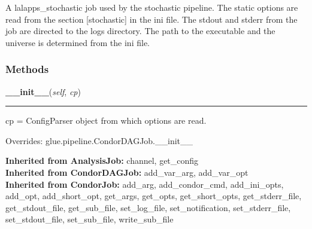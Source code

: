 A lalapps\_stochastic job used by the stochastic pipeline. The static 
options are read from the section [stochastic] in the ini file. The 
stdout and stderr from the job are directed to the logs directory. The 
path to the executable and the universe is determined from the ini file.



  \subsubsection{Methods}

    \label{stochastic:StochasticJob:__init__}
    \vspace{0.5ex}

    \begin{boxedminipage}{\textwidth}

    \raggedright \textbf{\_\_init\_\_}(\textit{self}, \textit{cp})

    \vspace{-1.5ex}

    \rule{\textwidth}{0.5\fboxrule}
    cp = ConfigParser object from which options are read.

    \vspace{1ex}

      Overrides: glue.pipeline.CondorDAGJob.\_\_init\_\_

    \end{boxedminipage}

  \textbf{Inherited from AnalysisJob:}
    channel,
    get\_config
    \\
  \textbf{Inherited from CondorDAGJob:}
    add\_var\_arg,
    add\_var\_opt
    \\
  \textbf{Inherited from CondorJob:}
    add\_arg,
    add\_condor\_cmd,
    add\_ini\_opts,
    add\_opt,
    add\_short\_opt,
    get\_args,
    get\_opts,
    get\_short\_opts,
    get\_stderr\_file,
    get\_stdout\_file,
    get\_sub\_file,
    set\_log\_file,
    set\_notification,
    set\_stderr\_file,
    set\_stdout\_file,
    set\_sub\_file,
    write\_sub\_file

